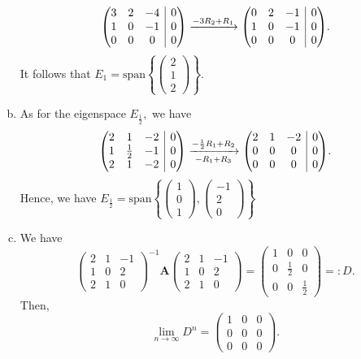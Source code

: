\documentclass{article}
\makeatletter
\newcommand{\matr}[1]{\mathbf{#1}}
\newcommand{\spn}{\text{span}}
\newenvironment{rowequmat}[1]{\left(\array{@{}#1@{}}}{\endarray\right)}
\makeatother
\begin{document}
\begin{enumerate}[(a)]
\begin{eqnarray*}
\begin{rowequmat}{ccc|c}
     3 & 2 & -4 & 0 \\
     1 & 0 & -1 & 0 \\
     0 & 0 & 0 & 0
    \end{rowequmat}
    \xrightarrow{-3R_2+R_1}\begin{rowequmat}{ccc|c}
     0 & 2 & -1 & 0 \\
     1 & 0 & -1 & 0 \\
     0 & 0 & 0 & 0
    \end{rowequmat}.
    \end{eqnarray*}
    It follows that $E_1=\spn\left\{\begin{pmatrix}2\\1\\2\end{pmatrix}\right\}.$
    \item As for the eigenspace $E_{\frac{1}{2}},$ we have
    $$\begin{rowequmat}{ccc|c}
     2 &  1 & -2 & 0 \\
     1 &  \frac{1}{2} & -1 & 0 \\
     2 &  1 & -2 & 0
    \end{rowequmat}\xrightarrow[-R_1+R_3]{-\frac{1}{2}R_1+R_2}\begin{rowequmat}{ccc|c}
     2 & 1 & -2 & 0 \\
     0 & 0 & 0 & 0 \\
     0 & 0 & 0 & 0
    \end{rowequmat}.$$
    Hence, we have $E_{\frac{1}{2}}=\spn\left\{\begin{pmatrix}1\\0\\1\end{pmatrix},\begin{pmatrix}-1\\2\\0\end{pmatrix}\right\}$
    \item We have $$\begin{pmatrix}2&1&-1\\1&0&2\\2&1&0\end{pmatrix}^{-1}\matr{A}\begin{pmatrix}2&1&-1\\1&0&2\\2&1&0\end{pmatrix}=\begin{pmatrix}1&0&0\\0&\frac{1}{2}&0\\0&0&\frac{1}{2}\end{pmatrix}=:D.$$
    Then, $$\lim_{n\to\infty}D^n=\begin{pmatrix}1&0&0\\0&0&0\\0&0&0\end{pmatrix}.$$
    

\end{enumerate}
\end{document}
